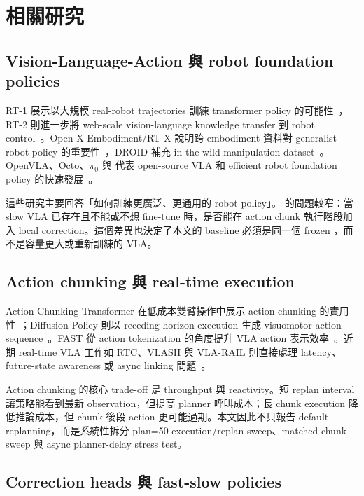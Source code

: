 \chapter{相關研究}
\label{ch:relatedwork}

\section{Vision-Language-Action 與 robot foundation policies}

RT-1 展示以大規模 real-robot trajectories 訓練 transformer policy 的可能性~\cite{brohan2022rt1}，RT-2 則進一步將 web-scale vision-language knowledge transfer 到 robot control~\cite{brohan2023rt2}。Open X-Embodiment/RT-X 說明跨 embodiment 資料對 generalist robot policy 的重要性~\cite{openx2024}，DROID 補充 in-the-wild manipulation dataset~\cite{khazatsky2024droid}。OpenVLA、Octo、$\pi_0$ 與 \smolvla{} 代表 open-source VLA 和 efficient robot foundation policy 的快速發展~\cite{kim2024openvla,ghosh2024octo,black2024pi0,shukor2025smolvla}。

這些研究主要回答「如何訓練更廣泛、更通用的 robot policy」。\method{} 的問題較窄：當 slow VLA 已存在且不能或不想 fine-tune 時，是否能在 action chunk 執行階段加入 local correction。這個差異也決定了本文的 baseline 必須是同一個 frozen \smolvla{}，而不是容量更大或重新訓練的 VLA。

\section{Action chunking 與 real-time execution}

Action Chunking Transformer 在低成本雙臂操作中展示 action chunking 的實用性~\cite{zhao2023aloha}；Diffusion Policy 則以 receding-horizon execution 生成 visuomotor action sequence~\cite{chi2023diffusionpolicy}。FAST 從 action tokenization 的角度提升 VLA action 表示效率~\cite{pertsch2025fast}。近期 real-time VLA 工作如 RTC、VLASH 與 VLA-RAIL 則直接處理 latency、future-state awareness 或 async linking 問題~\cite{black2025rtc,tang2025vlash,zhao2025vlarail}。

Action chunking 的核心 trade-off 是 throughput 與 reactivity。短 replan interval 讓策略能看到最新 observation，但提高 planner 呼叫成本；長 chunk execution 降低推論成本，但 chunk 後段 action 更可能過期。本文因此不只報告 default replanning，而是系統性拆分 plan=50 execution/replan sweep、matched chunk sweep 與 async planner-delay stress test。

\section{Correction heads 與 fast-slow policies}

